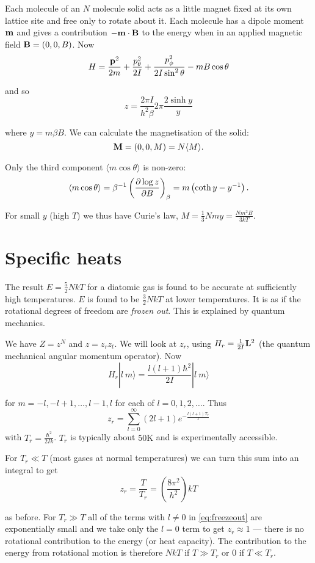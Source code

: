 \documentclass{notes}
\newcommand{\ket}[1]{|#1\rangle}
\newcommand{\ave}[1]{\langle#1\rangle}
\newcommand{\pdf}[3]{\left(\pd{#1}{#2}\right)_{#3}}
\begin{document}
Each molecule of an $N$ molecule solid acts as a little
magnet fixed at its own lattice site and free only to rotate
about it.  Each molecule has a dipole moment $\mathbf{m}$ and
gives a contribution $-\mathbf{m} \cdot \mathbf{B}$ to the energy
when in an applied magnetic field $\mathbf{B} = (0,0,B)$.  Now
\[
H = \frac{\mathbf{p}^2}{2 m} + \frac{p_\theta^2}{2 I}
+ \frac{p_\phi^2}{2 I \sin^2 \theta} - m B \cos \theta
\]

and so
\[
z = \frac{2 \pi I}{h^2 \beta} 2 \pi \frac{2 \sinh y}{y}
\]

where $y = m \beta B$.  We can calculate the magnetisation of the
solid:
\[
\vect{M} = (0,0,M) = N \ave{M}.
\]

Only the third component $\ave{m \cos \theta}$ is non-zero:
\[
\ave{m \cos \theta} = \beta^{-1} \pdf{\log z}{B}{\beta} = m \left(
\coth y - y^{-1} \right).
\]

For small $y$ (high $T$) we thus have Curie's law,
$M = \tfrac{1}{3} N m y = \tfrac{N m^2 B}{3 k T}$.

\section{Specific heats}

The result $E = \tfrac{5}{2} N k T$ for a diatomic gas is found to be
accurate at sufficiently high temperatures.  $E$ is found to be
$\tfrac{3}{2} N k T$ at lower temperatures.  It is as if the
rotational degrees of freedom are \emph{frozen out}.  This is explained
by quantum mechanics.

We have $Z = z^N$ and $z = z_r z_t$.  We will look at
$z_r$, using $H_r = \frac{1}{2 I} \mathbf{L}^2$ (the quantum mechanical
angular momentum operator).  Now
\[
H_r \ket{l\ m} = \frac{ l (l+1) \hbar^2}{2 I} \ket{l\ m}
\]

for $m = -l,-l+1,\dots, l-1,l$ for each of $l=0,1,2,\dots$.  Thus
\begin{equation}\label{eq:freezeout}
z_r = \sum_{l=0}^\infty (2 l + 1) e^{-\frac{l(l+1) T_r}{T}}
\end{equation}
with $T_r = \frac{\hbar^2}{2 I k}$.  $T_r$ is typically about $50
\mathrm{K}$ and is experimentally accessible.

For $T_r \ll T$ (most gases at normal temperatures) we can turn
this sum into an integral to get
\[
z_r = \frac{T}{T_r} = \left( \frac{8 \pi^2}{h^2} \right) k T
\]

as before.  For $T_r \gg T$ all of the terms with $l \neq 0$ in
\eqref{eq:freezeout} are exponentially small and we take only the $l
=0$ term to get $z_r \approx 1$ --- there is no rotational
contribution to the energy (or heat capacity).  The contribution to
the energy from rotational motion is therefore $N k T$ if $T \gg T_r$
or $0$ if $T \ll T_r$.
\end{document}
